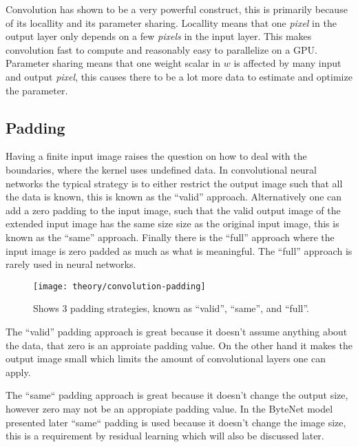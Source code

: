 Convolution has shown to be a very powerful construct, this is primarily because of its locallity and its parameter sharing. Locallity means that one \textit{pixel} in the output layer only depends on a few \textit{pixels} in the input layer. This makes convolution fast to compute and reasonably easy to parallelize on a GPU. Parameter sharing means that one weight scalar in $w$ is affected by many input and output \textit{pixel}, this causes there to be a lot more data to estimate and optimize the parameter.

\subsection{Padding}
Having a finite input image raises the question on how to deal with the boundaries, where the kernel uses undefined data. In convolutional neural networks the typical strategy is to either restrict the output image such that all the data is known, this is known as the ``valid'' approach. Alternatively one can add a zero padding to the input image, such that the valid output image of the extended input image has the same size size as the original input image, this is known as the ``same'' approach. Finally there is the ``full'' approach where the input image is zero padded as much as what is meaningful. The ``full'' approach is rarely used in neural networks.

\begin{figure}[h]
	\centering
	\texttt{[image: theory/convolution-padding]}
	\caption{Shows 3 padding strategies, known as ``valid'', ``same'', and ``full''.}
	\label{fig:convolution:padding}
\end{figure}

The ``valid'' padding approach is great because it doesn't assume anything about the data, that zero is an approiate padding value. On the other hand it makes the output image small which limits the amount of convolutional layers one can apply.

The ``same`` padding approach is great because it doesn't change the output size, however zero may not be an appropiate padding value. In the ByteNet model presented later ``same`` padding is used because it doesn't change the image size, this is a requirement by residual learning which will also be discussed later.

